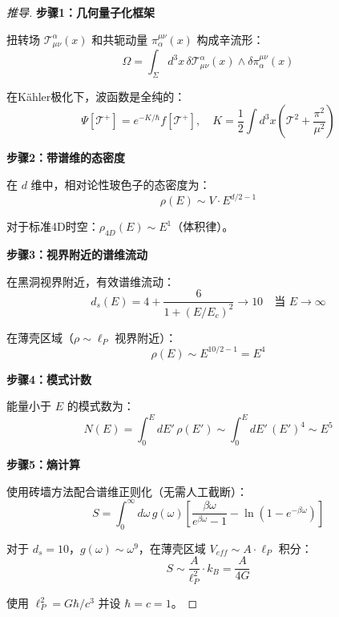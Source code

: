 \begin{proof}[推导]

\textbf{步骤1：几何量子化框架}

扭转场 $\mathcal{T}^\alpha_{\mu\nu}(x)$ 和共轭动量 $\pi_\alpha^{\mu\nu}(x)$ 构成辛流形：
\begin{equation}
\Omega = \int_\Sigma d^3x \, \delta \mathcal{T}^\alpha_{\mu\nu}(x) \wedge \delta \pi_\alpha^{\mu\nu}(x)
\end{equation}

在Kähler极化下，波函数是全纯的：
\begin{equation}
\Psi[\mathcal{T}^+] = e^{-K/\hbar} f[\mathcal{T}^+], \quad K = \frac{1}{2}\int d^3x \left(\mathcal{T}^2 + \frac{\pi^2}{\mu^2}\right)
\end{equation}

\textbf{步骤2：带谱维的态密度}

在 $d$ 维中，相对论性玻色子的态密度为：
\begin{equation}
\rho(E) \sim V \cdot E^{d/2 - 1}
\end{equation}

对于标准4D时空：$\rho_{4D}(E) \sim E^1$（体积律）。

\textbf{步骤3：视界附近的谱维流动}

在黑洞视界附近，有效谱维流动：
\begin{equation}
d_s(E) = 4 + \frac{6}{1 + (E/E_c)^2} \to 10 \quad \text{当 } E \to \infty
\end{equation}

在薄壳区域（$\rho \sim \ell_P$ 视界附近）：
\begin{equation}
\rho(E) \sim E^{10/2 - 1} = E^4
\end{equation}

\textbf{步骤4：模式计数}

能量小于 $E$ 的模式数为：
\begin{equation}
N(E) = \int_0^E dE' \, \rho(E') \sim \int_0^E dE' \, (E')^4 \sim E^5
\end{equation}

\textbf{步骤5：熵计算}

使用砖墙方法配合谱维正则化（无需人工截断）：
\begin{equation}
S = \int_0^\infty d\omega \, g(\omega) \left[\frac{\beta\omega}{e^{\beta\omega} - 1} - \ln(1 - e^{-\beta\omega})\right]
\end{equation}

对于 $d_s = 10$，$g(\omega) \sim \omega^9$，在薄壳区域 $V_{eff} \sim A \cdot \ell_P$ 积分：
\begin{equation}
S \sim \frac{A}{\ell_P^2} \cdot k_B = \frac{A}{4G}
\end{equation}

使用 $\ell_P^2 = G\hbar/c^3$ 并设 $\hbar = c = 1$。
\end{proof}


